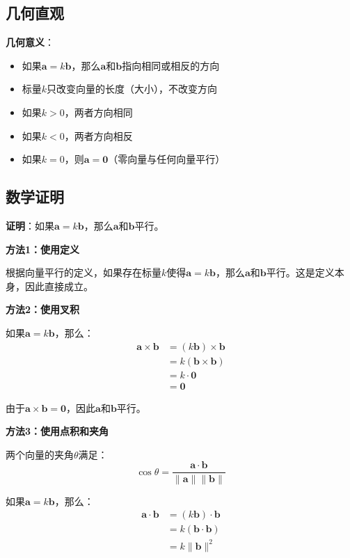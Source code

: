 \documentclass[12pt,a4paper]{article}
\begin{document}
\subsection{几何直观}

\textbf{几何意义}：
\begin{itemize}
\item 如果$\bm{a} = k \bm{b}$，那么$\bm{a}$和$\bm{b}$指向相同或相反的方向
\item 标量$k$只改变向量的长度（大小），不改变方向
\item 如果$k > 0$，两者方向相同
\item 如果$k < 0$，两者方向相反
\item 如果$k = 0$，则$\bm{a} = \bm{0}$（零向量与任何向量平行）
\end{itemize}

\subsection{数学证明}

\textbf{证明}：如果$\bm{a} = k \bm{b}$，那么$\bm{a}$和$\bm{b}$平行。

\textbf{方法1：使用定义}

根据向量平行的定义，如果存在标量$k$使得$\bm{a} = k \bm{b}$，那么$\bm{a}$和$\bm{b}$平行。这是定义本身，因此直接成立。

\textbf{方法2：使用叉积}

如果$\bm{a} = k \bm{b}$，那么：
\begin{align}
\bm{a} \times \bm{b} &= (k \bm{b}) \times \bm{b} \\
&= k (\bm{b} \times \bm{b}) \\
&= k \cdot \bm{0} \\
&= \bm{0}
\end{align}

由于$\bm{a} \times \bm{b} = \bm{0}$，因此$\bm{a}$和$\bm{b}$平行。

\textbf{方法3：使用点积和夹角}

两个向量的夹角$\theta$满足：
\begin{equation}
\cos\theta = \frac{\bm{a} \cdot \bm{b}}{\|\bm{a}\| \|\bm{b}\|}
\end{equation}

如果$\bm{a} = k \bm{b}$，那么：
\begin{align}
\bm{a} \cdot \bm{b} &= (k \bm{b}) \cdot \bm{b} \\
&= k (\bm{b} \cdot \bm{b}) \\
&= k \|\bm{b}\|^2
\end{align}
\end{document}
